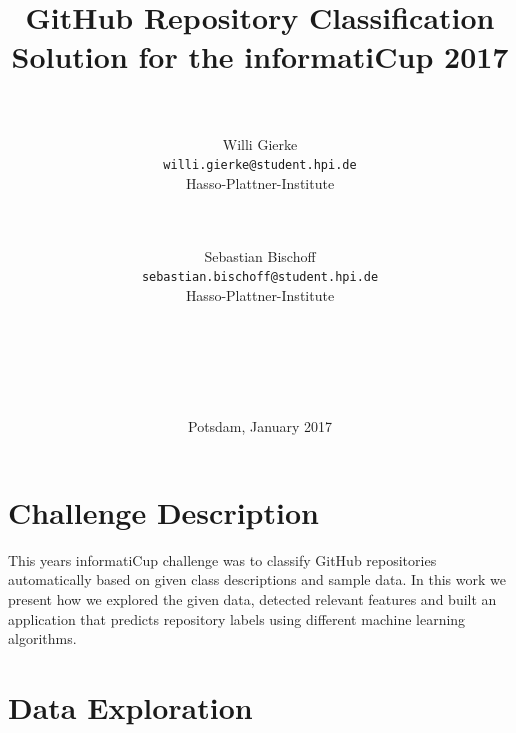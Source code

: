 \documentclass[%
a4paper,
DIV12,
2.5headlines,
bigheadings,
titlepage,
openbib,
]{scrartcl}
\begin{document}
\providecommand{\tightlist}{%
  \setlength{\itemsep}{0pt}\setlength{\parskip}{0pt}}

\DeclareRobustCommand{\desiredTitle}{
  GitHub Repository Classification\\\normalsize{Solution for the informatiCup 2017}
}

\DeclareRobustCommand{\desiredAuthor}{
  \\\\Willi Gierke\\\texttt{willi.gierke@student.hpi.de}\\Hasso-Plattner-Institute \and \\\\Sebastian Bischoff\\\texttt{sebastian.bischoff@student.hpi.de}\\Hasso-Plattner-Institute\\\\\\\\\\\\
}

\begin{titlepage}
\begin{center}
   \title{\desiredTitle}
   \author{\desiredAuthor}
   \date{Potsdam, January 2017}
   \maketitle
\end{center}
\end{titlepage}

\tableofcontents
\pagebreak

\section{Challenge Description}\label{challenge-description}

This years informatiCup challenge was to classify GitHub repositories automatically based on given class descriptions and sample data.
In this work we present how we explored the given data, detected relevant features and built an application that predicts repository labels using different machine learning algorithms.

\section{Data Exploration}\label{data-exploration}
\end{document}
